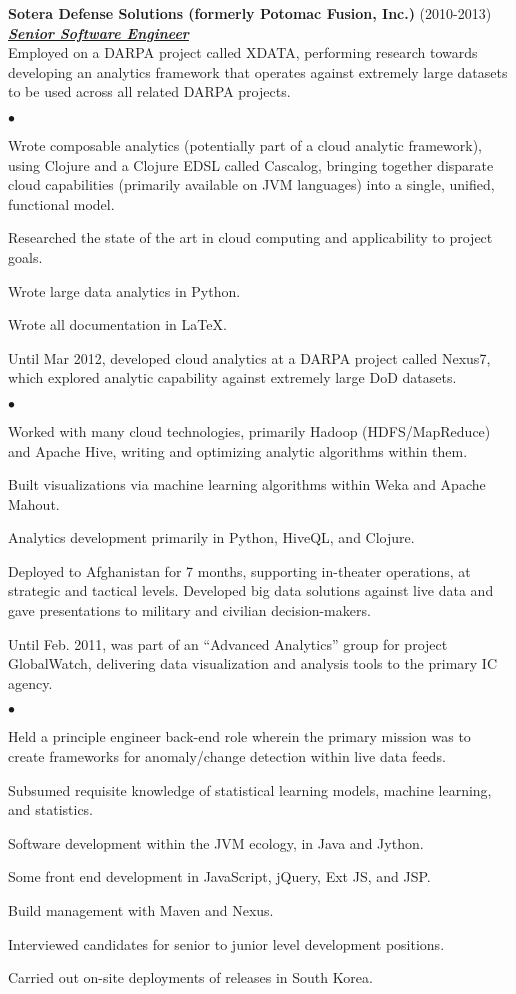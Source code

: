 \documentclass{article}
\newcommand{\employer}[3]{{ \textbf{#1} (#2)\\ \underline{\textbf{\emph{#3}}}\\  }}
\newenvironment{achievements}{\begin{list}{$\bullet$}{\topsep 0pt \itemsep
      -2pt}}{\vspace*{4pt}\end{list}}
\begin{document}
\employer{Sotera Defense Solutions (formerly Potomac Fusion,
  Inc.)}{2010-2013}{Senior Software Engineer} Employed on a DARPA project
called XDATA, performing research towards developing an analytics framework
that operates against extremely large datasets to be used across all related
DARPA projects.
\begin{achievements}
\item Wrote composable analytics (potentially part of a cloud analytic
  framework), using Clojure and a Clojure EDSL called Cascalog, bringing
  together disparate cloud capabilities (primarily available on JVM languages)
  into a single, unified, functional model.
\item Researched the state of the art in cloud computing and applicability to
  project goals.
\item Wrote large data analytics in Python.
\item Wrote all documentation in \LaTeX.
\end{achievements}
Until Mar 2012, developed cloud analytics at a DARPA project called Nexus7,
which explored analytic capability against extremely large DoD datasets.
\begin{achievements}
\item Worked with many cloud technologies, primarily Hadoop (HDFS/MapReduce)
  and Apache Hive, writing and optimizing analytic algorithms within them.
\item Built visualizations via machine learning algorithms within Weka and
  Apache Mahout.
\item Analytics development primarily in Python, HiveQL, and Clojure.
\item Deployed to Afghanistan for 7 months, supporting in-theater operations,
  at strategic and tactical levels.  Developed big data solutions against live
  data and gave presentations to military and civilian decision-makers.
\end{achievements}
Until Feb. 2011, was part of an ``Advanced Analytics'' group for project
GlobalWatch, delivering data visualization and analysis tools to the primary IC
agency.
\begin{achievements}
\item Held a principle engineer back-end role wherein the primary mission was
  to create frameworks for anomaly/change detection within live data feeds.
\item Subsumed requisite knowledge of statistical learning models, machine
  learning, and statistics.
\item Software development within the JVM ecology, in Java and Jython.
\item Some front end development in JavaScript, jQuery, Ext JS, and JSP.
\item Build management with Maven and Nexus.
\item Interviewed candidates for senior to junior level development positions.
\item Carried out on-site deployments of releases in South Korea.
\end{achievements}
\end{document}
